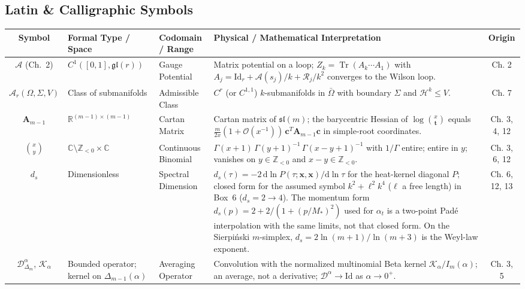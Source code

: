 \documentclass[11pt,a4paper,oneside]{article}
\begin{document}
\subsection{Latin \& Calligraphic Symbols}
\begin{table}[!htbp]
\centering
\scriptsize
\renewcommand{\arraystretch}{1.2}
\begin{tabularx}{\textwidth}{@{} c p{3.0cm} p{2.6cm} X c @{}}
\toprule
\textbf{Symbol} & \textbf{Formal Type / Space} & \textbf{Codomain / Range} & \textbf{Physical / Mathematical Interpretation} & \textbf{Origin} \\
\midrule
$\mathcal{A}$ (Ch.~2) & $C^1([0,1], \mathfrak{gl}(r))$ & Gauge Potential & Matrix potential on a loop; $Z_k = \operatorname{Tr}(A_k \cdots A_1)$ with $A_j = \mathrm{Id}_r + \mathcal{A}(s_j)/k + \mathcal{R}_j/k^2$ converges to the Wilson loop. & Ch. 2 \\
$\mathcal{A}_r(\Omega,\Sigma,V)$ & Class of submanifolds & Admissible Class & $C^r$ (or $C^{1,1}$) $k$-submanifolds in $\bar\Omega$ with boundary $\Sigma$ and $\mathcal{H}^k \le V$. & Ch. 7 \\
$\mathbf{A}_{m-1}$ & $\mathbb{R}^{(m-1)\times(m-1)}$ & Cartan Matrix & Cartan matrix of $\mathfrak{sl}(m)$; the barycentric Hessian of $\log\binom{x}{\mathbf{t}}$ equals $\frac{m}{2x}(1+\mathcal{O}(x^{-1}))\,\mathbf{c}^T\mathbf{A}_{m-1}\mathbf{c}$ in simple-root coordinates. & Ch. 3, 4, 12 \\
$\binom{x}{y}$ & $\mathbb{C}\setminus\mathbb{Z}_{<0} \times \mathbb{C}$ & Continuous Binomial & $\Gamma(x+1)\,\Gamma(y+1)^{-1}\,\Gamma(x-y+1)^{-1}$ with $1/\Gamma$ entire; entire in $y$; vanishes on $y \in \mathbb{Z}_{<0}$ and $x-y \in \mathbb{Z}_{<0}$. & Ch. 3, 6, 12 \\
$d_s$ & Dimensionless & Spectral Dimension & $d_s(\tau) = -2\,\mathrm{d}\ln P(\tau;\mathbf{x},\mathbf{x})/\mathrm{d}\ln\tau$ for the heat-kernel diagonal $P$; closed form for the assumed symbol $k^2 + \ell^2k^4$ ($\ell$ a free length) in Box~6 ($d_s = 2 \to 4$). The momentum form $d_s(p) = 2 + 2/(1 + (p/M_\ast)^2)$ used for $\alpha_t$ is a two-point Pad\'e interpolation with the same limits, not that closed form. On the Sierpi\'nski $m$-simplex, $d_s = 2\ln(m+1)/\ln(m+3)$ is the Weyl-law exponent. & Ch. 6, 12, 13 \\
$\mathcal{D}^\alpha_{\Delta_m}$, $\mathcal{K}_\alpha$ & Bounded operator; kernel on $\Delta_{m-1}(\alpha)$ & Averaging Operator & Convolution with the normalized multinomial Beta kernel $\mathcal{K}_\alpha/I_m(\alpha)$; an average, not a derivative; $\mathcal{D}^\alpha \to \mathrm{Id}$ as $\alpha \to 0^+$. & Ch. 3, 5 \\

\end{tabularx}
\end{table}
\end{document}
